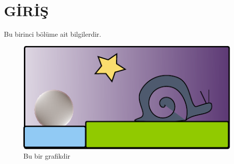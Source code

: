 \chapter{GİRİŞ}
Bu birinci bölüme ait bilgilerdir.

\begin{figure}[H]
\centering
\includegraphics{chapter1/graphs/drawing}
\caption{Bu bir grafikdir}
\end{figure}

